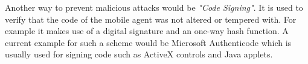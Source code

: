 \documentclass{report}
\begin{document}
\begin{enumerate}[a)]
			Another way to prevent malicious attacks would be \textit{"Code Signing"}. It is used to verify that the code of the mobile agent was not altered or tempered with. For example it makes use of a digital signature and an one-way hash function. A current example for such a scheme would be Microsoft Authenticode which is usually used for signing code such as ActiveX controls and Java applets.
		\end{enumerate}
	\closesection
	
	
\end{document}
